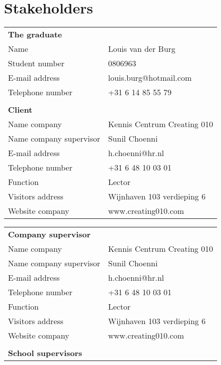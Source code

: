 \chapter{Stakeholders}
\begin{multicols}{2}

   \begin{tabular}
      { l l }
      \textbf{The graduate} & \\
      Name & Louis van der Burg \\
      Student number & 0806963 \\
      E-mail address & louis.burg@hotmail.com \\
      Telephone number & +31 6 14 85 55 79 \\
      & \\
      \textbf{Client} & \\
      Name company & Kennis Centrum Creating 010 \\
      Name company supervisor & Sunil Choenni \\
      E-mail address & h.choenni@hr.nl \\
      Telephone number & +31 6 48 10 03 01  \\
      Function & Lector \\
      Visitors address & Wijnhaven 103 verdieping 6 \\
      Website company & www.creating010.com \\
   \end{tabular}
   \begin{tabular}
      { l l }
      \textbf{Company supervisor} & \\
      Name company & Kennis Centrum Creating 010 \\
      Name company supervisor & Sunil Choenni \\
      E-mail address & h.choenni@hr.nl \\
      Telephone number & +31 6 48 10 03 01  \\
      Function & Lector \\
      Visitors address & Wijnhaven 103 verdieping 6 \\
      Website company & www.creating010.com \\
      & \\
      \textbf{School supervisors} & \\

\end{tabular}
\end{multicols}

